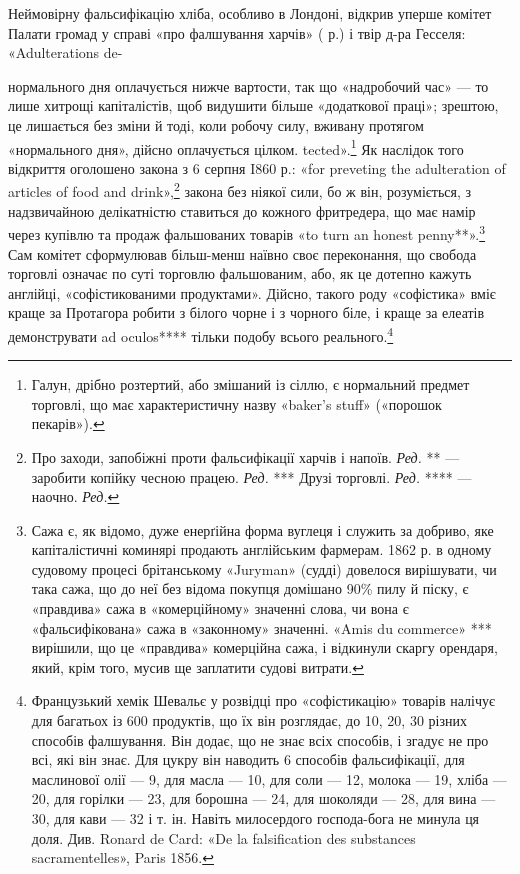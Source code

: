 Неймовірну фальсифікацію хліба, особливо в Лондоні, відкрив
уперше комітет Палати громад у справі «про фалшування
харчів» ( р.) і твір д-ра Гесселя: «Adulterations de-

нормального дня оплачується нижче вартости, так що «надробочий
час» — то лише хитрощі капіталістів, щоб видушити більше «додаткової
праці»; зрештою, це лишається без зміни й тоді, коли робочу силу, вживану
протягом «нормального дня», дійсно оплачується цілком.
tected».\footnote{
Галун, дрібно розтертий, або змішаний із сіллю, є нормальний
предмет торговлі, що має характеристичну назву «baker’s stuff» («порошок
пекарів»).
} Як наслідок того відкриття оголошено закона з 6 серпня
I860 р.: «for preveting the adulteration of articles of food
and drink»,\footnote*{
Про заходи, запобіжні проти фальсифікації харчів і напоїв. \emph{Ред.}
** — заробити копійку чесною працею. \emph{Ред.}
*** Друзі торговлі. \emph{Ред.}
**** — наочно. \emph{Ред.}
} закона без ніякої сили, бо ж він, розуміється, з
надзвичайною делікатністю ставиться до кожного фритредера,
що має намір через купівлю та продаж фальшованих товарів «to
turn an honest penny**».\footnote{
Сажа є, як відомо, дуже енерґійна форма вуглеця і служить за
добриво, яке капіталістичні коминярі продають англійським фармерам.
1862 р. в одному судовому процесі брітанському «Juryman» (судді) довелося
вирішувати, чи така сажа, що до неї без відома покупця домішано
90\% пилу й піску, є «правдива» сажа в «комерційному» значенні слова,
чи вона є «фальсифікована» сажа в «законному» значенні. «Amis du
commerce» *** вирішили, що це «правдива» комерційна сажа, і відкинули
скаргу орендаря, який, крім того, мусив ще заплатити судові витрати.
} Сам комітет сформулював більш-менш
наївно своє переконання, що свобода торговлі означає по суті
торговлю фальшованим, або, як це дотепно кажуть англійці, «софістикованими
продуктами». Дійсно, такого роду «софістика»
вміє краще за Протагора робити з білого чорне і з чорного біле,
і краще за елеатів демонструвати ad oculos**** тільки подобу всього
реального.\footnote{
Французький хемік Шевальє у розвідці про «софістикацію» товарів
налічує для багатьох із 600 продуктів, що їх він розглядає, до 10, 20,
30 різних способів фалшування. Він додає, що не знає всіх способів, і
згадує не про всі, які він знає. Для цукру він наводить 6 способів фальсифікації,
для маслинової олії — 9, для масла — 10, для соли — 12, молока
— 19, хліба — 20, для горілки — 23, для борошна — 24, для шоколяди
— 28, для вина — 30, для кави — 32 і т. ін. Навіть милосердого господа-бога
не минула ця доля. Див. Ronard de Card: «De la falsification
des substances sacramentelles», Paris 1856.
}

